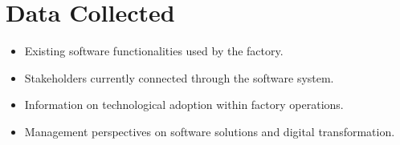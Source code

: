 \section*{Data Collected}
\begin{itemize}
  \item Existing software functionalities used by the factory.
  \item Stakeholders currently connected through the software system.
  \item Information on technological adoption within factory operations.
  \item Management perspectives on software solutions and digital transformation.
\end{itemize}
